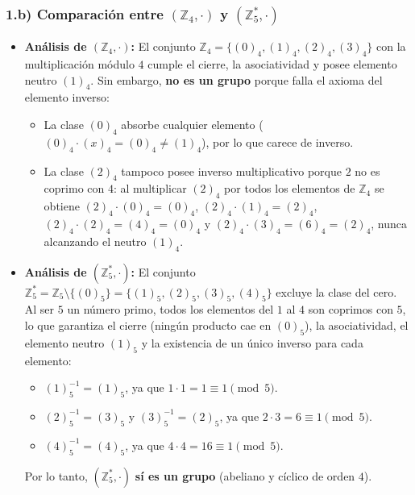 \documentclass[11pt, a4paper]{article}
\begin{document}
\subsubsection*{1.b) Comparación entre $(\mathbb{Z}_4, \cdot)$ y $(\mathbb{Z}_5^*, \cdot)$}
\begin{itemize}
    \item \textbf{Análisis de $(\mathbb{Z}_4, \cdot)$:} El conjunto $\mathbb{Z}_4 = \{(0)_4, (1)_4, (2)_4, (3)_4\}$ con la multiplicación módulo $4$ cumple el cierre, la asociatividad y posee elemento neutro $(1)_4$. Sin embargo, \textbf{no es un grupo} porque falla el axioma del elemento inverso:
    \begin{itemize}
        \item La clase $(0)_4$ absorbe cualquier elemento ($(0)_4 \cdot (x)_4 = (0)_4 \neq (1)_4$), por lo que carece de inverso.
        \item La clase $(2)_4$ tampoco posee inverso multiplicativo porque $2$ no es coprimo con $4$: al multiplicar $(2)_4$ por todos los elementos de $\mathbb{Z}_4$ se obtiene $(2)_4 \cdot (0)_4 = (0)_4$, $(2)_4 \cdot (1)_4 = (2)_4$, $(2)_4 \cdot (2)_4 = (4)_4 = (0)_4$ y $(2)_4 \cdot (3)_4 = (6)_4 = (2)_4$, nunca alcanzando el neutro $(1)_4$.
    \end{itemize}
    \item \textbf{Análisis de $(\mathbb{Z}_5^*, \cdot)$:} El conjunto $\mathbb{Z}_5^* = \mathbb{Z}_5 \setminus \{(0)_5\} = \{(1)_5, (2)_5, (3)_5, (4)_5\}$ excluye la clase del cero. Al ser $5$ un número primo, todos los elementos del $1$ al $4$ son coprimos con $5$, lo que garantiza el cierre (ningún producto cae en $(0)_5$), la asociatividad, el elemento neutro $(1)_5$ y la existencia de un único inverso para cada elemento:
    \begin{itemize}
        \item $(1)_5^{-1} = (1)_5$, ya que $1 \cdot 1 = 1 \equiv 1 \pmod 5$.
        \item $(2)_5^{-1} = (3)_5$ y $(3)_5^{-1} = (2)_5$, ya que $2 \cdot 3 = 6 \equiv 1 \pmod 5$.
        \item $(4)_5^{-1} = (4)_5$, ya que $4 \cdot 4 = 16 \equiv 1 \pmod 5$.
    \end{itemize}
    Por lo tanto, $(\mathbb{Z}_5^*, \cdot)$ \textbf{sí es un grupo} (abeliano y cíclico de orden $4$).
\end{itemize}
\end{document}
